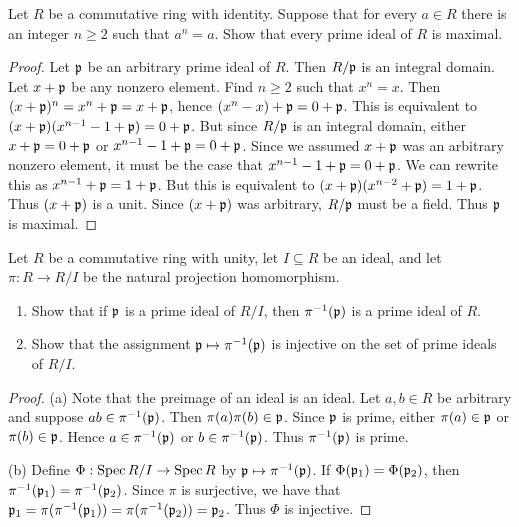\documentclass[10pt,twoside,openany]{memoir}
\begin{document}
\begin{problem}[W23, P3]
    Let $R$ be a commutative ring with identity. Suppose that for every $a \in R$ there is an integer $n \geq 2$ such that $a^n = a$. Show that every prime ideal of $R$ is maximal.
\end{problem}
    {\color{blue} \begin{proof}
        Let $\mathfrak{p}$ be an arbitrary prime ideal of $R$. Then $R/\mathfrak{p}$ is an integral domain. Let $x+ \mathfrak{p}$ be any nonzero element. Find $n \geq 2$ such that $x^n = x$. Then $(x+ \mathfrak{p})^n = x^n + \mathfrak{p} = x + \mathfrak{p}$, hence $(x^n - x) + \mathfrak{p} = 0 +\mathfrak{p}$. This is equivalent to $(x + \mathfrak{p})(x^{n-1} - 1 + \mathfrak{p}) = 0 + \mathfrak{p}$. But since $R/\mathfrak{p}$ is an integral domain, either $x + \mathfrak{p} = 0 + \mathfrak{p}$ or $x^{n-1} - 1 + \mathfrak{p} = 0 + \mathfrak{p}$. Since we assumed $x+\mathfrak{p}$ was an arbitrary nonzero element, it must be the case that $x^{n-1} - 1 + \mathfrak{p} = 0 + \mathfrak{p}$. We can rewrite this as $x^{n-1} + \mathfrak{p} = 1 + \mathfrak{p}$. But this is equivalent to $(x+\mathfrak{p})(x^{n-2} + \mathfrak{p}) = 1 + \mathfrak{p}$. Thus $(x+\mathfrak{p})$ is a unit. Since $(x+\mathfrak{p})$ was arbitrary, $R/\mathfrak{p}$ must be a field. Thus $\mathfrak{p}$ is maximal.
    \end{proof}}

\newpage
\begin{problem}[W21, P5]
Let $R$ be a commutative ring with unity, let $I \subseteq R$ be an ideal, and let $\pi:R \rightarrow R/I$ be the natural projection homomorphism.
\begin{enumerate}[label = (\alph*),itemsep=1pt,topsep=3pt]
    \item Show that if $\mathfrak{p}$ is a prime ideal of $R/I$, then $\pi^{-1}(\mathfrak{p})$ is a prime ideal of $R$.
    \item Show that the assignment $\mathfrak{p} \mapsto \pi^{-1}(\mathfrak{p})$ is injective on the set of prime ideals of $R/I$.
\end{enumerate}
\end{problem}
    {\color{blue} \begin{proof}
        (a) Note that the preimage of an ideal is an ideal. Let $a,b \in R$ be arbitrary and suppose $ab \in \pi^{-1}(\mathfrak{p})$. Then $\pi(a)\pi(b) \in \mathfrak{p}$. Since $\mathfrak{p}$ is prime, either $\pi(a) \in \mathfrak{p}$ or $\pi(b) \in \mathfrak{p}$. Hence $a \in \pi^{-1}(\mathfrak{p})$ or $b \in \pi^{-1}(\mathfrak{p})$. Thus $\pi^{-1}(\mathfrak{p})$ is prime.

        (b) Define $\Phi:\operatorname{Spec} R/I \rightarrow \operatorname{Spec} R$ by $\mathfrak{p} \mapsto \pi^{-1}(\mathfrak{p})$. If $\Phi(\mathfrak{p}_1) = \Phi(\mathfrak{p}_2)$, then $\pi^{-1}(\mathfrak{p}_1) = \pi^{-1}(\mathfrak{p}_2)$. Since $\pi$ is surjective, we have that $\mathfrak{p}_1 = \pi(\pi^{-1}(\mathfrak{p}_1)) = \pi(\pi^{-1}(\mathfrak{p}_2)) = \mathfrak{p}_2$. Thus $\Phi$ is injective.
    \end{proof}}
\end{document}
